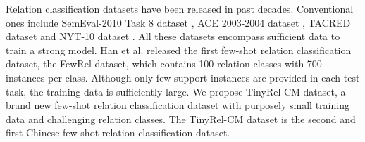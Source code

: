 Relation classification datasets have been released in past decades. Conventional ones include SemEval-2010 Task 8 dataset \cite{semeval8}, ACE 2003-2004 dataset \cite{ace}, TACRED dataset \cite{zhang-etal-2017-position} and NYT-10 dataset \cite{NYTdataset}. All these datasets encompass sufficient data to train a strong model.
Han et al.  released the first few-shot relation classification dataset, the FewRel dataset, which contains 100 relation classes with 700 instances per class. 
Although only few support instances are provided in each test task, the training data is sufficiently large. %
We propose TinyRel-CM dataset, %
a brand new few-shot relation classification dataset with purposely small training data and challenging relation classes.
The TinyRel-CM dataset is the second and first Chinese few-shot relation classification dataset.
